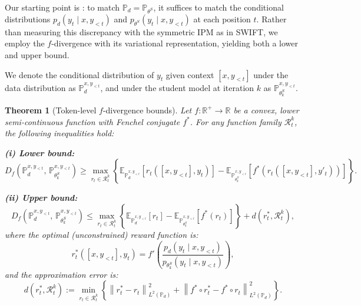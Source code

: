 \documentclass[11pt,a4paper]{article}
\newtheorem{theorem}{Theorem}[section]
\newcommand{\Pd}{\mathbb{P}_d}
\newcommand{\Ps}{\mathbb{P}_{\theta^S}}
\newcommand{\E}{\mathbb{E}}
\newcommand{\R}{\mathbb{R}}
\newcommand{\Df}{D_f}
\begin{document}
Our starting point is : to match $\Pd = \Ps$, it suffices to match the conditional distributions $p_d(y_t \mid x, y_{<t})$ and $p_{\theta^S}(y_t \mid x, y_{<t})$ at each position $t$. Rather than measuring this discrepancy with the symmetric IPM as in SWIFT, we employ the $f$-divergence with its variational representation, yielding both a lower and upper bound.

We denote the conditional distribution of $y_t$ given context $[x, y_{<t}]$ under the data distribution as $\Pd^{x, y_{<t}}$, and under the student model at iteration $k$ as $\mathbb{P}_{\theta^S_k}^{x, y_{<t}}$.

\begin{theorem}[Token-level $f$-divergence bounds]
\label{thm:f_bounds}
Let $f: \R^+ \to \R$ be a convex, lower semi-continuous function with Fenchel conjugate $f^*$. For any function family $\mathcal{R}_t^k$, the following inequalities hold:

\textbf{(i) Lower bound:}
\begin{equation}
    \Df\!\left(\Pd^{x,y_{<t}},\, \mathbb{P}_{\theta^S_k}^{x,y_{<t}}\right) \geq \max_{r_t \in \mathcal{R}_t^k} \left\{ \E_{\Pd^{x,y_{<t}}}\!\left[r_t([x, y_{<t}], y_t)\right] - \E_{\mathbb{P}_{\theta^S_k}^{x,y_{<t}}}\!\left[f^*\!\left(r_t([x, y_{<t}], y'_t)\right)\right] \right\}.
    \label{eq:lower_bound}
\end{equation}

\textbf{(ii) Upper bound:}
\begin{equation}
    \Df\!\left(\Pd^{x,y_{<t}},\, \mathbb{P}_{\theta^S_k}^{x,y_{<t}}\right) \leq \max_{r_t \in \mathcal{R}_t^k} \left\{ \E_{\Pd^{x,y_{<t}}}\!\left[r_t\right] - \E_{\mathbb{P}_{\theta^S_k}^{x,y_{<t}}}\!\left[f^*(r_t)\right] \right\} + d(r_t^*, \mathcal{R}_t^k),
    \label{eq:upper_bound}
\end{equation}
where the optimal (unconstrained) reward function is:
\begin{equation}
    r_t^*([x, y_{<t}], y_t) = f'\!\left(\frac{p_d(y_t \mid x, y_{<t})}{p_{\theta^S_k}(y_t \mid x, y_{<t})}\right),
    \label{eq:optimal_reward}
\end{equation}
and the approximation error is:
\begin{equation}
    d(r_t^*, \mathcal{R}_t^k) := \min_{r_t \in \mathcal{R}_t^k} \left\{ \left\|r_t^* - r_t\right\|^2_{L^2(\Pd)} + \left\|f^* \circ r_t^* - f^* \circ r_t\right\|^2_{L^2(\Pd)} \right\}.
    \label{eq:approx_error}
\end{equation}
\end{theorem}
\end{document}
